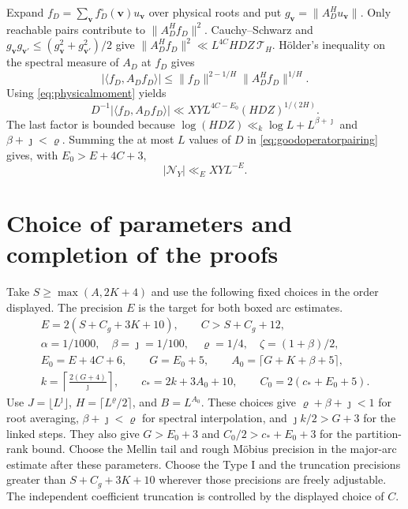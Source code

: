 \documentclass[11pt]{amsart}
\numberwithin{equation}{section}
\theoremstyle{remark}
\begin{document}
Expand $f_D=\sum_{\mathbf v}f_D^\circ(\mathbf v)u_{\mathbf v}$ over
physical roots and put $g_{\mathbf v}=\|A_D^Hu_{\mathbf v}\|$.
Only reachable pairs contribute to $\|A_D^Hf_D\|^2$.
Cauchy--Schwarz and $g_{\mathbf v}g_{\mathbf v'}\le
(g_{\mathbf v}^2+g_{\mathbf v'}^2)/2$ give
$\|A_D^Hf_D\|^2\ll L^{4C}HDZ\,\mathcal T_H$.
H\"older's inequality on the spectral measure of $A_D$ at $f_D$
gives
\[
 |\langle f_D,A_Df_D\rangle|
 \le\|f_D\|^{2-1/H}\|A_D^Hf_D\|^{1/H}.
\]
Using \eqref{eq:physicalmoment} yields
\[
 D^{-1}|\langle f_D,A_D f_D\rangle|
 \ll XYL^{4C-E_0}(HDZ)^{1/(2H)}.
\]
The last factor is bounded because $\log(HDZ)\ll_k
\log L+L^{\beta+\jmath}$ and $\beta+\jmath<\varrho$. Summing the
at most $L$ values of $D$ in \eqref{eq:goodoperatorpairing}
gives, with $E_0>E+4C+3$,
\begin{equation}\label{eq:minorbound}
 |\mathcal N_Y|\ll_E XYL^{-E}.
\end{equation}

\section{Choice of parameters and completion of the proofs}\label{sec:parameters}

Take $S\ge\max(A,2K+4)$ and use the following fixed choices in the order displayed. The precision $E$ is the target for both boxed arc estimates.
\[
\begin{gathered}
 E=2(S+C_g+3K+10),\qquad C>S+C_g+12,\\
 \alpha=1/1000,\quad \beta=\jmath=1/100,\quad \varrho=1/4,\quad \zeta=(1+\beta)/2,\\
 E_0=E+4C+6,\qquad G=E_0+5,\qquad A_0=\lceil G+K+\beta+5\rceil,\\
 k=\left\lceil\frac{2(G+4)}{\jmath}\right\rceil,\qquad
 c_*=2k+3A_0+10,\qquad C_0=2(c_*+E_0+5).
\end{gathered}
\]
Use $J=\lfloor L^\jmath\rfloor$, $H=\lceil L^\varrho/2\rceil$, and $B=L^{A_0}$. These choices give $\varrho+\beta+\jmath<1$ for root averaging, $\beta+\jmath<\varrho$ for spectral interpolation, and $\jmath k/2>G+3$ for the linked steps. They also give $G>E_0+3$ and $C_0/2>c_*+E_0+3$ for the partition-rank bound. Choose the Mellin tail and rough M\"obius precision in the major-arc estimate after these parameters. Choose the Type I and the truncation precisions greater than $S+C_g+3K+10$ wherever those precisions are freely adjustable. The independent coefficient truncation is controlled by the displayed choice of $C$.
\end{document}
